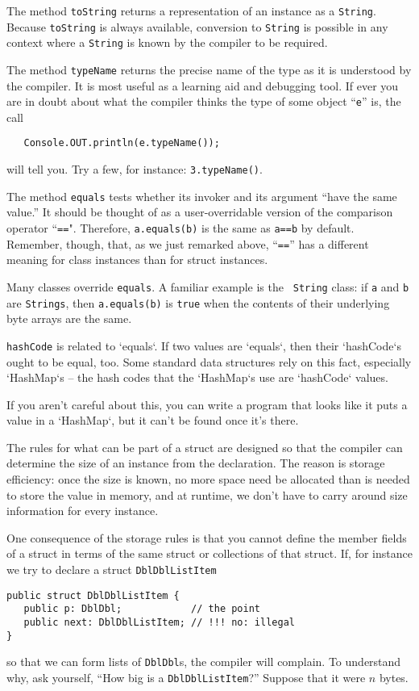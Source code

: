 The method {\tt toString} returns
a representation of an instance as a {\tt String}.  Because {\tt toString} is
always available, conversion to {\tt String} is possible in any context where a
{\tt String} is known by the compiler to be required. 

The method {\tt typeName} returns the precise name of the type as it is
understood by the \Xten{} compiler.  It is most useful as a learning aid and
debugging tool.  If ever you are in doubt about what the compiler thinks the
type of some object ``{\tt e}'' is, the call

{\tt  \ \ \ Console.OUT.println(e.typeName());}

will tell you.  Try a few, for instance: {\tt 3.typeName()}.

The method {\tt equals} tests whether its invoker and its argument ``have the
same value.''  It should be thought of as a user-overridable version of the
comparison operator ``{\tt ==}".  Therefore, {\tt a.equals(b)} is the same as
{\tt a==b} by default.  Remember, though, that, as we just remarked above,
``{\tt ==}'' has a different meaning for class instances than for
struct instances.
 
Many classes override {\tt equals}.  A familiar example is the {\tt
String} class: if {\tt a} and {\tt b} are {\tt Strings}, then {\tt a.equals(b)}
is {\tt true} when the contents of their underlying byte arrays are the same.

{\tt hashCode} is related to \xcd`equals`.  If two values are \xcd`equals`,
then their \xcd`hashCode`s ought to be equal, too.  Some standard data
structures rely on this fact, especially \xcd`HashMap`s -- the hash codes that
the \xcd`HashMap`s use are \xcd`hashCode` values.

If you aren't careful about this, you can write a program that looks like it
puts a value in a \xcd`HashMap`, but it can't be found once it's there.

The rules for what can be part of a struct are designed so that the compiler
can determine the size of an instance from the declaration.  The reason is
storage efficiency:  once the size is known, no more space need be allocated
than is needed to store the value in memory, and at runtime, we don't have to
carry around size information for every instance.

One consequence of the storage rules is that you cannot define the member
fields of a struct in terms of the same struct or collections of that
struct.  If, for instance we try to declare a struct {\tt DblDblList\-Item} 
\begin{verbatim}
public struct DblDblListItem {
   public p: DblDbl;            // the point
   public next: DblDblListItem; // !!! no: illegal
}
\end{verbatim}
so that we can form lists of {\tt DblDbl}s, the compiler will complain.
To understand why, ask yourself, ``How big is a {\tt DblDbl\-List\-Item}?''
Suppose that it were {$n$} bytes.

